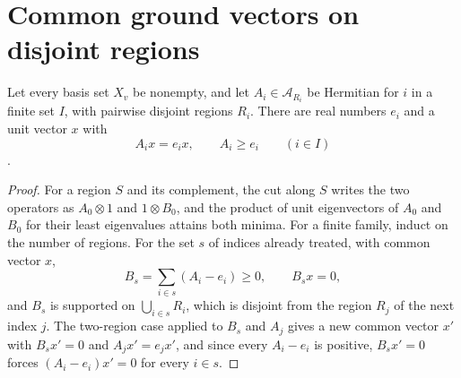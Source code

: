 \section{Common ground vectors on disjoint regions}
\label{sec:hamiltonians_disjoint_ground}

\begin{theorem}
    \label{thm:hamiltonians_disjoint_common_ground}
    \leanok
    Let every basis set $X_v$ be nonempty, and let $A_i\in\mathcal A_{R_i}$ be
    Hermitian for $i$ in a finite set $I$, with pairwise disjoint regions $R_i$.
    There are real numbers $e_i$ and a unit vector $x$ with
    \[
        A_ix=e_ix,\qquad A_i\ge e_i\qquad(i\in I)
    \]
    \cite[lines 979--1005]{Arad2016RigorousRG}.
\end{theorem}
\begin{proof}\leanok
    For a region $S$ and its complement, the cut along $S$ writes the two
    operators as $A_0\otimes1$ and $1\otimes B_0$, and the product of unit
    eigenvectors of $A_0$ and $B_0$ for their least eigenvalues attains both
    minima. For a finite family, induct on the number of regions. For the set $s$ of
    indices already treated, with common vector $x$,
    \[
        B_s=\sum_{i\in s}(A_i-e_i)\ge0,\qquad B_sx=0,
    \]
    and $B_s$ is supported on $\bigcup_{i\in s}R_i$, which is disjoint from the
    region $R_j$ of the next index $j$. The two-region case applied to $B_s$ and
    $A_j$ gives a new common vector $x'$ with $B_sx'=0$ and $A_jx'=e_jx'$, and since
    every $A_i-e_i$ is positive, $B_sx'=0$ forces $(A_i-e_i)x'=0$ for every
    $i\in s$.
\end{proof}

